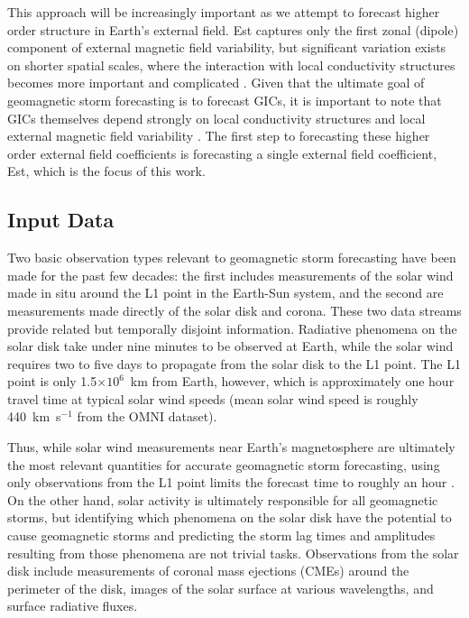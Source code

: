 This approach will be increasingly important as we attempt to forecast higher order structure in Earth's external field. Est captures only the first zonal (dipole) component of external magnetic field variability, but significant variation exists on shorter spatial scales, where the interaction with local conductivity structures becomes more important and complicated \citep{Kelbert2020}. Given that the ultimate goal of geomagnetic storm forecasting is to forecast GICs, it is important to note that GICs themselves depend strongly on local conductivity structures and local external magnetic field variability \citep{Olsen2004, Puethe2014}. The first step to forecasting these higher order external field coefficients is forecasting a single external field coefficient, Est, which is the focus of this work.


\subsection{Input Data}

Two basic observation types relevant to geomagnetic storm forecasting have been made for the past few decades: the first includes measurements of the solar wind made in situ around the L1 point in the Earth-Sun system, and the second are measurements made directly of the solar disk and corona. These two data streams provide related but temporally disjoint information. Radiative phenomena on the solar disk take under nine minutes to be observed at Earth, while the solar wind requires two to five days to propagate from the solar disk to the L1 point. The L1 point is only 1.5$\times 10^{6}$~km from Earth, however, which is approximately one hour travel time at typical solar wind speeds (mean solar wind speed is roughly 440~km~s$^{-1}$ from the OMNI dataset).

Thus, while solar wind measurements near Earth's magnetosphere are ultimately the most relevant quantities for accurate geomagnetic storm forecasting, using only observations from the L1 point limits the forecast time to roughly an hour \citep{Shprits2019}. On the other hand, solar activity is ultimately responsible for all geomagnetic storms, but identifying which phenomena on the solar disk have the potential to cause geomagnetic storms and predicting the storm lag times and amplitudes resulting from those phenomena are not trivial tasks. Observations from the solar disk include measurements of coronal mass ejections (CMEs) around the perimeter of the disk, images of the solar surface at various wavelengths, and surface radiative fluxes. 

